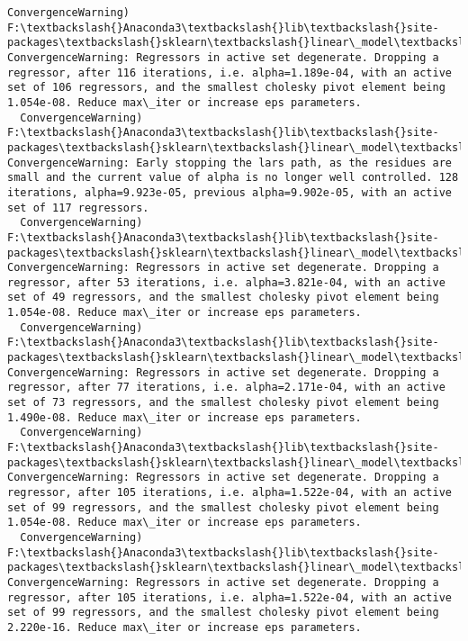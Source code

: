 \documentclass[11pt]{article}
\begin{document}
\begin{Verbatim}[commandchars=\\\{\}]
  ConvergenceWarning)
F:\textbackslash{}Anaconda3\textbackslash{}lib\textbackslash{}site-packages\textbackslash{}sklearn\textbackslash{}linear\_model\textbackslash{}least\_angle.py:313: ConvergenceWarning: Regressors in active set degenerate. Dropping a regressor, after 116 iterations, i.e. alpha=1.189e-04, with an active set of 106 regressors, and the smallest cholesky pivot element being 1.054e-08. Reduce max\_iter or increase eps parameters.
  ConvergenceWarning)
F:\textbackslash{}Anaconda3\textbackslash{}lib\textbackslash{}site-packages\textbackslash{}sklearn\textbackslash{}linear\_model\textbackslash{}least\_angle.py:339: ConvergenceWarning: Early stopping the lars path, as the residues are small and the current value of alpha is no longer well controlled. 128 iterations, alpha=9.923e-05, previous alpha=9.902e-05, with an active set of 117 regressors.
  ConvergenceWarning)
F:\textbackslash{}Anaconda3\textbackslash{}lib\textbackslash{}site-packages\textbackslash{}sklearn\textbackslash{}linear\_model\textbackslash{}least\_angle.py:313: ConvergenceWarning: Regressors in active set degenerate. Dropping a regressor, after 53 iterations, i.e. alpha=3.821e-04, with an active set of 49 regressors, and the smallest cholesky pivot element being 1.054e-08. Reduce max\_iter or increase eps parameters.
  ConvergenceWarning)
F:\textbackslash{}Anaconda3\textbackslash{}lib\textbackslash{}site-packages\textbackslash{}sklearn\textbackslash{}linear\_model\textbackslash{}least\_angle.py:313: ConvergenceWarning: Regressors in active set degenerate. Dropping a regressor, after 77 iterations, i.e. alpha=2.171e-04, with an active set of 73 regressors, and the smallest cholesky pivot element being 1.490e-08. Reduce max\_iter or increase eps parameters.
  ConvergenceWarning)
F:\textbackslash{}Anaconda3\textbackslash{}lib\textbackslash{}site-packages\textbackslash{}sklearn\textbackslash{}linear\_model\textbackslash{}least\_angle.py:313: ConvergenceWarning: Regressors in active set degenerate. Dropping a regressor, after 105 iterations, i.e. alpha=1.522e-04, with an active set of 99 regressors, and the smallest cholesky pivot element being 1.054e-08. Reduce max\_iter or increase eps parameters.
  ConvergenceWarning)
F:\textbackslash{}Anaconda3\textbackslash{}lib\textbackslash{}site-packages\textbackslash{}sklearn\textbackslash{}linear\_model\textbackslash{}least\_angle.py:313: ConvergenceWarning: Regressors in active set degenerate. Dropping a regressor, after 105 iterations, i.e. alpha=1.522e-04, with an active set of 99 regressors, and the smallest cholesky pivot element being 2.220e-16. Reduce max\_iter or increase eps parameters.

\end{Verbatim}
\end{document}
